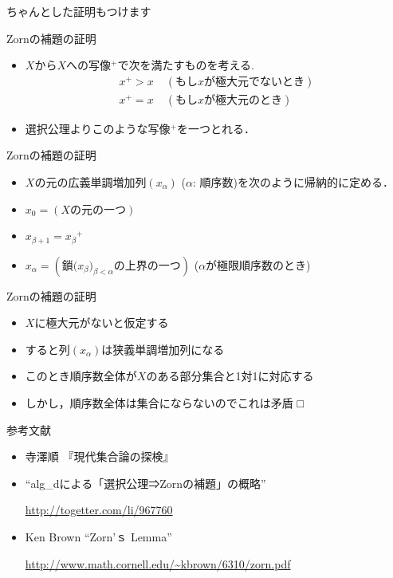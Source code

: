 \documentclass[dvipdfmx,17pt]{beamer}
\theoremstyle{plain}
\begin{document}
\begin{frame}
ちゃんとした証明もつけます
\end{frame}

\begin{frame}{Zornの補題の証明}
\begin{itemize}
\item $X$から$X$への写像$^+$で次を満たすものを考える.
\begin{align*}
x^+ > x &\; (\text{もし$x$が極大元でないとき}) \\
x^+ = x &\; (\text{もし$x$が極大元のとき})
\end{align*}
\item 選択公理よりこのような写像$^+$を一つとれる．
\end{itemize}
\end{frame}

\begin{frame}{Zornの補題の証明}
\begin{itemize}
\item $X$の元の広義単調増加列$(x_\alpha)$ ($\alpha$: 順序数)を次のように帰納的に定める．
\item $x_0 = (\text{$X$の元の一つ})$
\item $x_{\beta+1} = {x_\beta}^+$
\item $x_{\alpha} = (\text{鎖($x_\beta)_{\beta < \alpha}$の上界の一つ})$ ($\alpha$が極限順序数のとき)
\end{itemize}
\end{frame}

\begin{frame}{Zornの補題の証明}
\begin{itemize}
\item $X$に極大元がないと仮定する
\item すると列$(x_\alpha)$は狭義単調増加列になる
\item このとき順序数全体が$X$のある部分集合と1対1に対応する
\item しかし，順序数全体は集合にならないのでこれは矛盾 □
\end{itemize}
\end{frame}


\begin{frame}{参考文献}
\begin{itemize}
\item 寺澤順 『現代集合論の探検』
\item “alg\_dによる「選択公理⇒Zornの補題」の概略”

\url{http://togetter.com/li/967760}
\item Ken Brown “Zorn'ｓ Lemma”

\url{http://www.math.cornell.edu/~kbrown/6310/zorn.pdf}
\end{itemize}
\end{frame}
\end{document}

